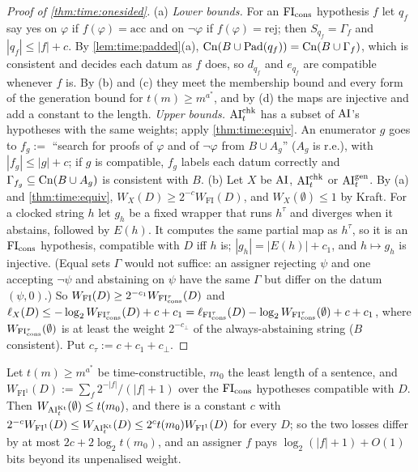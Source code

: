 \begin{proof}[Proof of \cref{thm:time:onesided}]
(a) \emph{Lower bounds.} For an $\mathrm{FI}_{\mathrm{cons}}$ hypothesis $f$ let $q_f$ say yes on $\varphi$ if $f(\varphi)=\mathrm{acc}$ and on $\neg\varphi$ if $f(\varphi)=\mathrm{rej}$; then $S_{q_f}=\Gamma_f$ and $|q_f|\le|f|+c$. By \cref{lem:time:padded}(a), $\mathrm{Cn}(B\cup\mathrm{Pad}(q_f))=\mathrm{Cn}(B\cup\Gamma_f)$, which is consistent and decides each datum as $f$ does, so $d_{q_f}$ and $e_{q_f}$ are compatible whenever $f$ is. By (b) and (c) they meet the membership bound and every form of the generation bound for $t(m)\ge m^{a^*}$, and by (d) the maps are injective and add a constant to the length. \emph{Upper bounds.} $\mathrm{AI}^{\mathrm{chk}}_t$ has a subset of $\mathrm{AI}$'s hypotheses with the same weights; apply \cref{thm:time:equiv}. An enumerator $g$ goes to $f_g:=$ ``search for proofs of $\varphi$ and of $\neg\varphi$ from $B\cup A_g$'' ($A_g$ is r.e.), with $|f_g|\le|g|+c$; if $g$ is compatible, $f_g$ labels each datum correctly and $\Gamma_{f_g}\subseteq\mathrm{Cn}(B\cup A_g)$ is consistent with $B$.
(b) Let $X$ be $\mathrm{AI}$, $\mathrm{AI}^{\mathrm{chk}}_t$ or $\mathrm{AI}^{\mathrm{gen}}_t$. By (a) and \cref{thm:time:equiv}, $W_X(D)\ge2^{-c}W_{\mathrm{FI}}(D)$, and $W_X(\emptyset)\le1$ by Kraft. For a clocked string $h$ let $g_h$ be a fixed wrapper that runs $h^\tau$ and diverges when it abstains, followed by $E(h)$. It computes the same partial map as $h^\tau$, so it is an $\mathrm{FI}_{\mathrm{cons}}$ hypothesis, compatible with $D$ iff $h$ is; $|g_h|=|E(h)|+c_1$, and $h\mapsto g_h$ is injective. (Equal sets $\Gamma$ would not suffice: an assigner rejecting $\psi$ and one accepting $\neg\psi$ and abstaining on $\psi$ have the same $\Gamma$ but differ on the datum $(\psi,0)$.) So $W_{\mathrm{FI}}(D)\ge2^{-c_1}W_{\mathrm{FI}_{\mathrm{cons}}^\tau}(D)$ and
$\ell_X(D)\le-\log_2W_{\mathrm{FI}_{\mathrm{cons}}^\tau}(D)+c+c_1=\ell_{\mathrm{FI}_{\mathrm{cons}}^\tau}(D)-\log_2W_{\mathrm{FI}_{\mathrm{cons}}^\tau}(\emptyset)+c+c_1$, where $W_{\mathrm{FI}_{\mathrm{cons}}^\tau}(\emptyset)$ is at least the weight $2^{-c_\perp}$ of the always-abstaining string ($B$ consistent). Put $c_\tau:=c+c_1+c_\perp$.
\end{proof}

\begin{proposition}\label{prop:time:kt}
Let $t(m)\ge m^{a^*}$ be time-constructible, $m_0$ the least length of a sentence, and $W_{\mathrm{FI}^1}(D):=\sum_f2^{-|f|}/(|f|+1)$ over the $\mathrm{FI}_{\mathrm{cons}}$ hypotheses compatible with $D$. Then $W_{\mathrm{AI}^{\mathrm{Kt}}_t}(\emptyset)\le t(m_0)$, and there is a constant $c$ with $2^{-c}W_{\mathrm{FI}^1}(D)\le W_{\mathrm{AI}^{\mathrm{Kt}}_t}(D)\le2^ct(m_0)W_{\mathrm{FI}^1}(D)$ for every $D$; so the two losses differ by at most $2c+2\log_2t(m_0)$, and an assigner $f$ pays $\log_2(|f|+1)+O(1)$ bits beyond its unpenalised weight.
\end{proposition}

